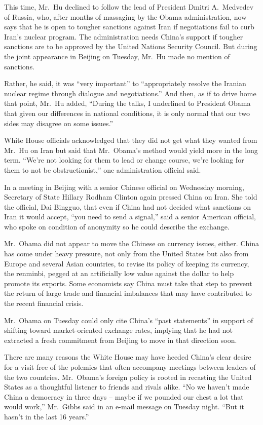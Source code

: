 ﻿\documentclass[12pt]{article}
\begin{document}
This time, Mr.~Hu declined to follow the lead of President Dmitri A.~Medvedev of Russia, who, after
months of massaging by the Obama administration, now says that he is open to tougher sanctions
against Iran if negotiations fail to curb Iran's nuclear program. The administration needs China's
support if tougher sanctions are to be approved by the United Nations Security Council. But during
the joint appearance in Beijing on Tuesday, Mr.~Hu made no mention of sanctions.

Rather, he said, it was ``very important'' to ``appropriately resolve the Iranian nuclear regime
through dialogue and negotiations.'' And then, as if to drive home that point, Mr.~Hu added,
``During the talks, I underlined to President Obama that given our differences in national
conditions, it is only normal that our two sides may disagree on some issues.''

White House officials acknowledged that they did not get what they wanted from Mr.~Hu on Iran but
said that Mr.~Obama's method would yield more in the long term. ``We're not looking for them to lead
or change course, we're looking for them to not be obstructionist,'' one administration official
said.

In a meeting in Beijing with a senior Chinese official on Wednesday morning, Secretary of State
Hillary Rodham Clinton again pressed China on Iran. She told the official, Dai Bingguo, that even if
China had not decided what sanctions on Iran it would accept, ``you need to send a signal,'' said a
senior American official, who spoke on condition of anonymity so he could describe the exchange.

Mr.~Obama did not appear to move the Chinese on currency issues, either. China has come under heavy
pressure, not only from the United States but also from Europe and several Asian countries, to
revise its policy of keeping its currency, the renminbi, pegged at an artificially low value against
the dollar to help promote its exports. Some economists say China must take that step to prevent the
return of large trade and financial imbalances that may have contributed to the recent financial
crisis.

Mr.~Obama on Tuesday could only cite China's ``past statements'' in support of shifting toward
market-oriented exchange rates, implying that he had not extracted a fresh commitment from Beijing
to move in that direction soon.

There are many reasons the White House may have heeded China's clear desire for a visit free of the
polemics that often accompany meetings between leaders of the two countries. Mr.~Obama's foreign
policy is rooted in recasting the United States as a thoughtful listener to friends and rivals
alike. ``No we haven't made China a democracy in three days -- maybe if we pounded our chest a lot
that would work,'' Mr.~Gibbs said in an e-mail message on Tuesday night. ``But it hasn't in the last
16 years.''
\end{document}

